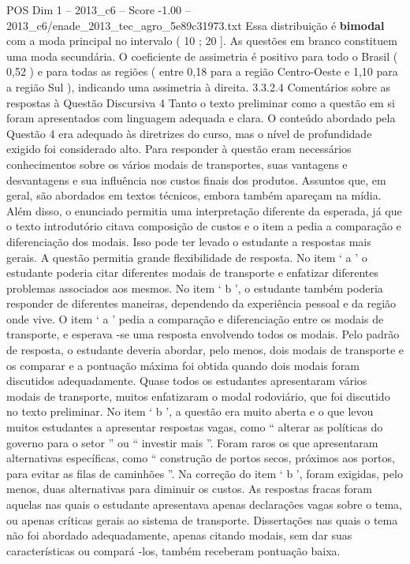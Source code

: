 \begin{textsample}{POS Dim 1 – 2013\_c6 – Score -1.00 – 2013\_c6/enade\_2013\_tec\_agro\_5e89c31973.txt}
Essa distribuição é \textbf{bimodal} com a moda principal no intervalo ( 10 ; 20 ].
As questões em branco constituem uma moda secundária.
O coeficiente de assimetria é positivo para todo o Brasil ( 0,52 ) e para todas as regiões ( entre 0,18 para a região Centro-Oeste e 1,10 para a região Sul ), indicando uma assimetria à direita. 3.3.2.4 Comentários sobre as respostas à Questão Discursiva 4 Tanto o texto preliminar como a questão em si foram apresentados com linguagem adequada e clara.
O conteúdo abordado pela Questão 4 era adequado às diretrizes do curso, mas o nível de profundidade exigido foi considerado alto.
Para responder à questão eram necessários conhecimentos sobre os vários modais de transportes, suas vantagens e desvantagens e sua influência nos custos finais dos produtos.
Assuntos que, em geral, são abordados em textos técnicos, embora também apareçam na mídia.
Além disso, o enunciado permitia uma interpretação diferente da esperada, já que o texto introdutório citava composição de custos e o item a pedia a comparação e diferenciação dos modais.
Isso pode ter levado o estudante a respostas mais gerais.
A questão permitia grande flexibilidade de resposta.
No item ‘ a ’ o estudante poderia citar diferentes modais de transporte e enfatizar diferentes problemas associados aos mesmos.
No item ‘ b ’, o estudante também poderia responder de diferentes maneiras, dependendo da experiência pessoal e da região onde vive.
O item ‘ a ’ pedia a comparação e diferenciação entre os modais de transporte, e esperava -se uma resposta envolvendo todos os modais.
Pelo padrão de resposta, o estudante deveria abordar, pelo menos, dois modais de transporte e os comparar e a pontuação máxima foi obtida quando dois modais foram discutidos adequadamente.
Quase todos os estudantes apresentaram vários modais de transporte, muitos enfatizaram o modal rodoviário, que foi discutido no texto preliminar.
No item ‘ b ’, a questão era muito aberta e o que levou muitos estudantes a apresentar respostas vagas, como “ alterar as políticas do governo para o setor ” ou “ investir mais ”.
Foram raros os que apresentaram alternativas específicas, como “ construção de portos secos, próximos aos portos, para evitar as filas de caminhões ”.
Na correção do item ‘ b ’, foram exigidas, pelo menos, duas alternativas para diminuir os custos.
As respostas fracas foram aquelas nas quais o estudante apresentava apenas declarações vagas sobre o tema, ou apenas críticas gerais ao sistema de transporte.
Dissertações nas quais o tema não foi abordado adequadamente, apenas citando modais, sem dar suas características ou compará -los, também receberam pontuação baixa.

\end{textsample}
